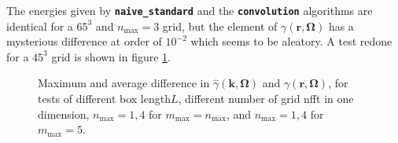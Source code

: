 The energies given by \texttt{\textbf{naive\_standard}} and the \texttt{\textbf{convolution}}
algorithms are identical for a $65^{3}$ and $n_{\max}=3$ grid, but
the element of $\gamma(\mathbf{r},\mathbf{\Omega})$ has a mysterious
difference at order of $10^{-2}$ which seems to be aleatory. A test redone %
for a $45^{3}$ grid is shown in figure \ref{fig:Difference-in-gamma}.

\begin{figure}[H]
\begin{centering}
\par\end{centering}
\begin{centering}
\par\end{centering}
\caption[Maximum and average difference in $\hat{\gamma}(\mathbf{k},\mathbf{\Omega})$
and $\gamma(\mathbf{r},\mathbf{\Omega})$]{Maximum and average difference in $\hat{\gamma}(\mathbf{k},\mathbf{\Omega})$
and $\gamma(\mathbf{r},\mathbf{\Omega})$, for tests of different
box length$L$, different number of grid nfft in one dimension, $n_{\max}=1,4$
for $m_{\max}=n_{\max}$, and $n_{\max}=1,4$ for $m_{\max}=5$.\label{fig:Difference-in-gamma}}
\end{figure}

